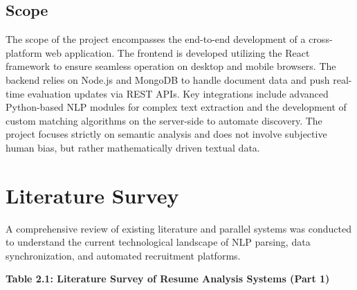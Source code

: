 \documentclass[12pt,a4paper]{report}
\begin{document}
\section{Scope}

The scope of the project encompasses the end-to-end development of a cross-platform web application. The frontend is developed utilizing the React framework to ensure seamless operation on desktop and mobile browsers. The backend relies on Node.js and MongoDB to handle document data and push real-time evaluation updates via REST APIs. Key integrations include advanced Python-based NLP modules for complex text extraction and the development of custom matching algorithms on the server-side to automate discovery. The project focuses strictly on semantic analysis and does not involve subjective human bias, but rather mathematically driven textual data.

\chapter{Literature Survey}

A comprehensive review of existing literature and parallel systems was conducted to understand the current technological landscape of NLP parsing, data synchronization, and automated recruitment platforms.

\begin{center}
\textbf{Table 2.1: Literature Survey of Resume Analysis Systems (Part 1)}
\end{center}
\end{document}
